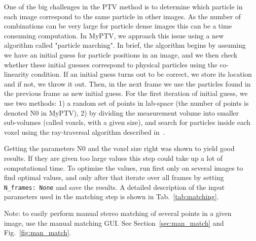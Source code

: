 \documentclass[10pt,a4paper]{article}
\begin{document}
One of the big challenges in the PTV method is to determine which particle in each image correspond to the same particle in other images. As the number of combinations can be very large for particle dense images this can be a time consuming computation. In MyPTV, we approach this issue using a new algorithm called "particle marching". In brief, the algorithm begins by assuming we have an initial guess for particle positions in an image, and we then check whether these initial guesses correspond to physical particles using the co-linearity condition. If an initial guess turns out to be correct, we store its location and if not, we throw it out. Then, in the next frame we use the particles found in the previous frame as new initial guess. For the first iteration of initial guess, we use two methods: 1) a random set of points in lab-space (the number of points is denoted N0 in MyPTV), 2) by dividing the measurement volume into smaller sub-volumes (called voxels, with a given size), and search for particles inside each voxel using the ray-traversal algorithm described in~\cite{Bourgoin2020}.
     

Getting the parameters N0 and the voxel size right was shown to yield good results. If they are given too large values this step could take up a lot of computational time. To optimize the values, run first only on several images to find optimal values, and only after that iterate over all frames by setting \texttt{N\_frames: None} and save the results. 
A detailed description of the input parameters used in the matching step is shown in Tab.~\ref{tab:matching}.


Note: to easily perform manual stereo matching of several points in a given image, use the manual matching GUI. See Section~\ref{sec:man_match} and Fig.~\ref{fig:man_match}.
\end{document}

